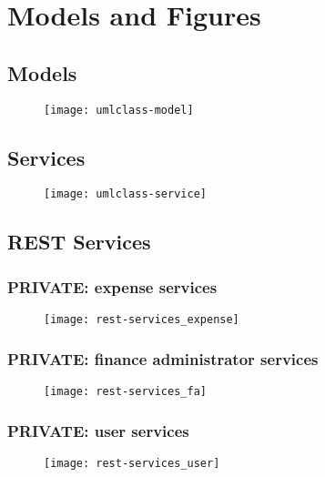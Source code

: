 \chapter{Models and Figures}

\section{Models}
\label{sec:app-models}

\begin{figure}[H]
    {\texttt{[image: umlclass-model]}}
\end{figure}
\newpage

\section{Services}
\label{sec:app-service}

\begin{figure}[H]
    {\texttt{[image: umlclass-service]}}
\end{figure}
\newpage

\section{REST Services}
\label{sec:rest-services}

\subsection{PRIVATE: expense services}
\begin{figure}[H]
    {\texttt{[image: rest-services\_expense]}}
\end{figure}
\newpage

\subsection{PRIVATE: finance administrator services}
\begin{figure}[H]
    {\texttt{[image: rest-services\_fa]}}
\end{figure}

\subsection{PRIVATE: user services}
\begin{figure}[H]
    {\texttt{[image: rest-services\_user]}}
\end{figure}

